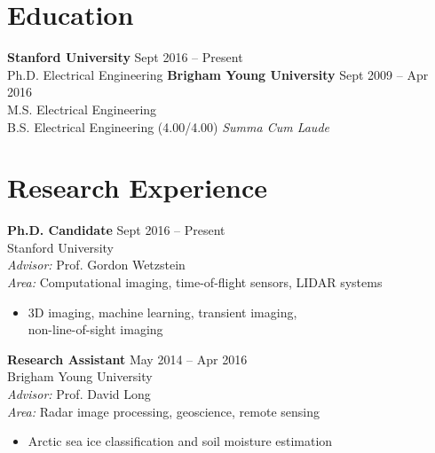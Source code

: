 \documentclass[10pt,letter,sans]{moderncv}
\begin{document}
\makecvtitle

\vspace{-11mm}

\section{Education}
  {\bf Stanford University}
  {\hfill}
  Sept 2016 -- Present \\
    \hspace*{1em} 
    Ph.D. Electrical Engineering
  \newline
  {\bf Brigham Young University}
  {\hfill}
  Sept 2009 -- Apr 2016 \\
    \hspace*{1em} 
    M.S. Electrical Engineering\\ \hspace*{1em} B.S. Electrical Engineering (4.00/4.00) \textit{Summa Cum Laude}
  \newline
  \vspace{-5mm}


\section{Research Experience}
	  {\bf Ph.D. Candidate} \hfill Sept 2016 -- Present\\
	  {{ Stanford University}}\\
	  {\it Advisor:} Prof. Gordon Wetzstein\\
	  {\it Area:} Computational imaging, time-of-flight sensors, LIDAR systems
	  \begin{itemize}
	  \item 3D imaging, machine learning, transient imaging,\\ non-line-of-sight imaging
	  \end{itemize}
	  \vspace{3mm}
	  {\bf Research Assistant} \hfill May 2014 -- Apr 2016\\
	  {{ Brigham Young University}}\\
	  {\it Advisor:} Prof. David Long\\
	  {\it Area:} Radar image processing, geoscience, remote sensing
	  \begin{itemize}
	  \item Arctic sea ice classification and soil moisture estimation
	  \end{itemize}
	  \vspace{3mm}
  \vspace{-5mm}
\end{document}
